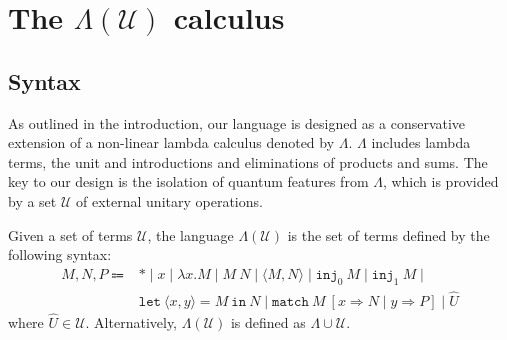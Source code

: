 \section{\texorpdfstring{The $\Lambda(\mathcal{U})$ calculus}{The Lambda(U) calculus}}
\subsection{Syntax}
As outlined in the introduction, our language is designed as a conservative extension of a non-linear lambda calculus denoted by $\Lambda$.
$\Lambda$ includes lambda terms, the unit and introductions and eliminations of products and sums.
The key to our design is the isolation of quantum features from $\Lambda$, which is provided by a set $\mathcal{U}$ of external unitary operations.
\begin{dfn}
  Given a set of terms $\mathcal{U}$, the language $\Lambda(\mathcal{U})$ is the set of terms defined by the following syntax:
  \begin{equation*}
    \begin{array}{rl}
      M, N, P \Coloneqq & *\mid x\mid\lambda x. M\mid M\ N\mid\langle M, N\rangle\mid\texttt{inj}_0\ M\mid\texttt{inj}_1\ M \mid \\& \texttt{let}\ \langle x, y\rangle=M\ \texttt{in}\ N\mid\texttt{match}\ M\ [x\Rightarrow N\mid y\Rightarrow P]\mid\hat{U}
    \end{array}
  \end{equation*}
  where $\hat{U}\in\mathcal{U}$. Alternatively, $\Lambda(\mathcal{U})$ is defined as $\Lambda\cup\mathcal{U}$.
\end{dfn}

